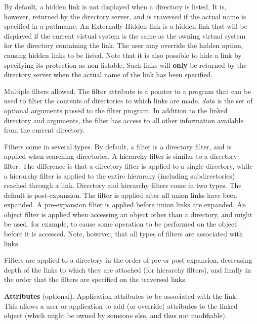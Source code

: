 \begin{description}
\item[Hidden/Not-Hidden/Externally-Hidden\footnote{Not yet implemented}]
By default, a hidden 
link is not displayed when a directory is listed.  It is, however,
returned by the directory server, and is traversed if the actual name
is specified in a pathname.  An Externally-Hidden link is a hidden
link that will be displayed if the current virtual system is the same
as the owning virtual system for the directory containing the link.
The user may override the hidden option, causing hidden links to be
listed. Note that it is also possible to hide a link by
specifying its protection as non-listable.  Such links will {\bf only}
be returned by the directory server when the actual name of the link
has been specified.

\item[] Multiple filters
allowed.  The filter attribute is a pointer to a program that can be
used to filter the contents of directories to which links are made.
{\it data} is the set of optional arguments passed to the filter
program.  In addition to the linked directory and arguments, the
filter has access to all other information available from the current
directory.

Filters come in several types.  By default, a filter is a directory
filter, and is applied when searching directories.  A hierarchy filter
is similar to a directory filter.  The difference is that a directory
filter is applied to a single directory, while a hierarchy filter is
applied to the entire hierarchy (including subdirectories) reached
through a link.  Directory and hierarchy filters come in two types.
The default is post-expansion.  The filter is applied after all union
links have been expanded.  A pre-expansion filter is applied before
union links are expanded.  An object filter is applied when accessing
an object other than a directory, and might be used, for example, to
cause some operation to be performed on the object before it is
accessed.  Note, however, that all types of filters are associated
with links.

Filters are applied to a directory in the order of pre-or post
expansion, decreasing depth of the links to which they are attached
(for hierarchy filters), and finally in the order that the filters are
specified on the traversed links.

\item {\bf Attributes} (optional).  Application attributes to be
associated with the link.  This allows a user or application to add
(or override) attributes to the linked object (which might be owned by
someone else, and thus not modifiable).


\end{description}
